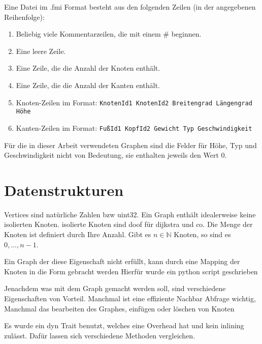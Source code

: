 \begin{definition}
    Eine Datei im .fmi Format besteht aus den folgenden Zeilen (in der angegebenen Reihenfolge):
    \begin{enumerate}
        \item
              Beliebig viele Kommentarzeilen, die mit einem \# beginnen.

        \item
              Eine leere Zeile.

        \item
              Eine Zeile, die die Anzahl der Knoten enthält.

        \item
              Eine Zeile, die die Anzahl der Kanten enthält.

        \item
              Knoten-Zeilen im Format: \texttt{KnotenId1 KnotenId2 Breitengrad Längengrad Höhe}

        \item
              Kanten-Zeilen im Format: \texttt{FußId1 KopfId2 Gewicht Typ Geschwindigkeit}

    \end{enumerate}
\end{definition}

Für die in dieser Arbeit verwendeten Graphen sind die Felder für Höhe, Typ und Geschwindigkeit nicht von Bedeutung, sie enthalten jeweils den Wert 0.

\section{Datenstrukturen}

Vertices sind natürliche Zahlen bzw uint32.
Ein Graph enthält idealerweise keine isolierten Knoten.
isolierte Knoten sind doof für dijkstra und co.
Die Menge der Knoten ist definiert durch Ihre Anzahl.
Gibt es $n \in \mathbb{N}$ Knoten, so sind es $0, \dotsc, n - 1$.

Ein Graph der diese Eigenschaft nicht erfüllt, kann durch eine Mapping der Knoten in die Form gebracht werden
Hierfür wurde ein python script geschrieben

Jenachdem was mit dem Graph gemacht werden soll, sind verschiedene Eigenschaften von Vorteil.
Manchmal ist eine effiziente Nachbar Abfrage wichtig,
Manchmal das bearbeiten des Graphes, einfügen oder löschen von Knoten

Es wurde ein dyn Trait benutzt, welches eine Overhead hat und kein inlining zulässt.
Dafür lassen sich verschiedene Methoden vergleichen.

